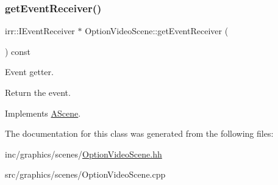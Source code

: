 \subsubsection{\texorpdfstring{get\+Event\+Receiver()}{getEventReceiver()}}
{\footnotesize\ttfamily irr\+::\+I\+Event\+Receiver $\ast$ Option\+Video\+Scene\+::get\+Event\+Receiver (\begin{DoxyParamCaption}{ }\end{DoxyParamCaption}) const\hspace{0.3cm}{\ttfamily [virtual]}}



Event getter. 

Return the event. 

Implements \hyperlink{classAScene_af521e5e6d30a5d2e5d30eb333e4d3abd}{A\+Scene}.



The documentation for this class was generated from the following files\+:\begin{DoxyCompactItemize}
\item 
inc/graphics/scenes/\hyperlink{OptionVideoScene_8hh}{Option\+Video\+Scene.\+hh}\item 
src/graphics/scenes/Option\+Video\+Scene.\+cpp\end{DoxyCompactItemize}
